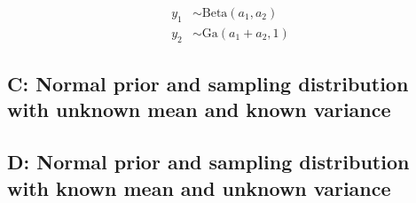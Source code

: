 \documentclass[12pt]{article}%
\begin{document}
            \begin{align}
                  y_1 &\sim \text{Beta}(a_1, a_2)\\
                  y_2 &\sim \text{Ga}(a_1 + a_2, 1)
            \end{align}

      \subsection*{C: Normal prior and sampling distribution with unknown mean and known variance}

      \subsection*{D: Normal prior and sampling distribution with known mean and unknown variance}
\end{document}
